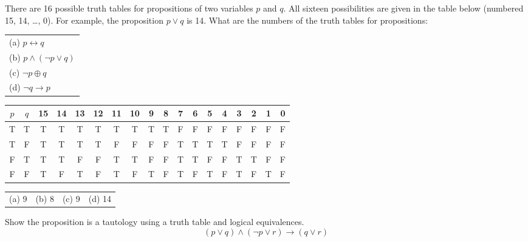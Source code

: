 \documentclass[12pt,addpoints]{exam}
\begin{document}
\begin{questions}
\question[8] There are 16 possible truth tables for propositions of two variables $p$ and $q$.
 All sixteen possibilities are given in the table below (numbered 15, 14, \ldots, 0).
 For example, the proposition $p \vee q$ is 14. What are the numbers of the truth
 tables for propositions:\\
 \begin{tabular}{l}
    (a) $p \leftrightarrow q$ \\
    (b) $p \wedge (\neg p \vee q)$ \\
    (c) $\neg p \oplus q $ \\
    (d) $\neg q \rightarrow p$ \\
 \end{tabular}

 \begin{tabular}{cc|cccc|cccc|cccc|cccc}
    $p$ & $q$ & 15 & 14 & 13 & 12 & 11 & 10 & 9 & 8 & 7 & 6 & 5 & 4 & 3 & 2 & 1 & 0 \\
    \hline
    T & T & T & T & T & T & T & T & T & T & F & F & F & F & F & F & F & F \\
    T & F & T & T & T & T & F & F & F & F & T & T & T & T & F & F & F & F \\
    F & T & T & T & F & F & T & T & F & F & T & T & F & F & T & T & F & F \\
    F & F & T & F & T & F & T & F & T & F & T & F & T & F & T & F & T & F \\
 \end{tabular}
 \begin{solution}
    \begin{tabular}{llll}
        (a) 9 \hspace{0.5in} & (b) 8 \hspace{0.5in} & (c) 9 \hspace{0.5in} & (d) 14 \\
    \end{tabular}
 \end{solution}

\question[8] Show the proposition is a tautology using a truth table
and logical equivalences.
 $$ (p \vee q) \wedge (\neg p \vee r) \rightarrow (q \vee r) $$


\end{questions}
\end{document}
